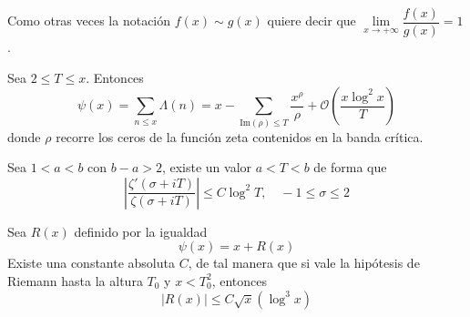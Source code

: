\documentclass[TAN.tex]{subfiles}
\begin{document}
Como otras veces la notación $f(x) \sim g(x)$ quiere decir que $\lim\limits_{x \to +∞} \dfrac{f(x)}{g(x)} = 1$.

\begin{teorema}
Sea $2 ≤ T ≤ x$. Entonces
\[ ψ(x) = \sum_{n≤x} Λ(n) = x - \sum_{\text{Im}(ρ)≤T} \frac{x^ρ}{ρ} + \mathcal{O}\left(\frac{x\log^2 x}{T}\right) \]
donde $ρ$ recorre los ceros de la función zeta contenidos en la banda crítica.
\end{teorema}

\begin{lemma}
Sea $1<a<b$ con $b-a>2$, existe un valor $a<T<b$ de forma que
\[ \left|\frac{ζ'(σ+iT)}{ζ(σ+iT)}\right| ≤ C \log^2 T, \quad -1≤σ≤2 \]
\end{lemma}

\begin{teorema}
Sea $R(x)$ definido por la igualdad
\[ ψ(x) = x + R(x) \]
Existe una constante absoluta $C$, de tal manera que si vale la hipótesis de Riemann hasta la altura $T_0$ y $x < T_0^2$, entonces
\[ |R(x)| ≤ C \sqrt{x} (\log^3 x) \]
\end{teorema}
\end{document}
